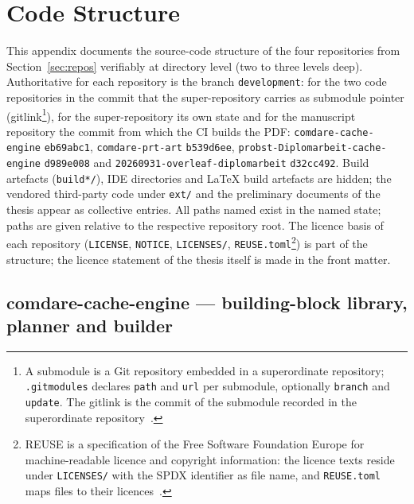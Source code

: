 \chapter{Code Structure}\label{app:code}

This appendix documents the source-code structure of the four repositories from Section~\ref{sec:repos}
verifiably at directory level (two to three levels deep). Authoritative for each repository is the branch
\texttt{development}: for the two code repositories in the commit that the super-repository carries as
submodule pointer (gitlink\footnote{A submodule is a Git repository embedded in a superordinate
repository; \texttt{.gitmodules} declares \texttt{path} and \texttt{url} per submodule, optionally
\texttt{branch} and \texttt{update}. The gitlink is the commit of the submodule recorded in the
superordinate repository~\cite{git2026gitmodules}.}), for the super-repository its own state and
for the manuscript repository the commit from which the CI builds the PDF\@: \texttt{comdare-cache-engine}
\texttt{eb69abc1}, \texttt{comdare-prt-art} \texttt{b539d6ee},
\texttt{probst-\allowbreak{}Diplomarbeit-\allowbreak{}cache-\allowbreak{}engine} \texttt{d989e008} and
\texttt{20260931-\allowbreak{}overleaf-\allowbreak{}diplomarbeit} \texttt{d32cc492}. Build artefacts
(\texttt{build*/}), IDE directories and LaTeX build artefacts are hidden; the vendored third-party code
under \texttt{ext/} and the preliminary documents of the thesis appear as collective entries. All paths
named exist in the named state; paths are given relative to the respective repository root. The
licence basis of each repository (\texttt{LICENSE}, \texttt{NOTICE}, \texttt{LICENSES/},
\texttt{REUSE.toml}\footnote{REUSE is a specification of the Free Software Foundation Europe for
machine-readable licence and copyright information: the licence texts reside under \texttt{LICENSES/}
with the SPDX identifier as file name, and \texttt{REUSE.toml} maps files to their
licences~\cite{fsfe2024reuse}.}) is part of the structure; the licence statement of the thesis itself is
made in the front matter.

\section*{comdare-cache-engine --- building-block library, planner and builder}

